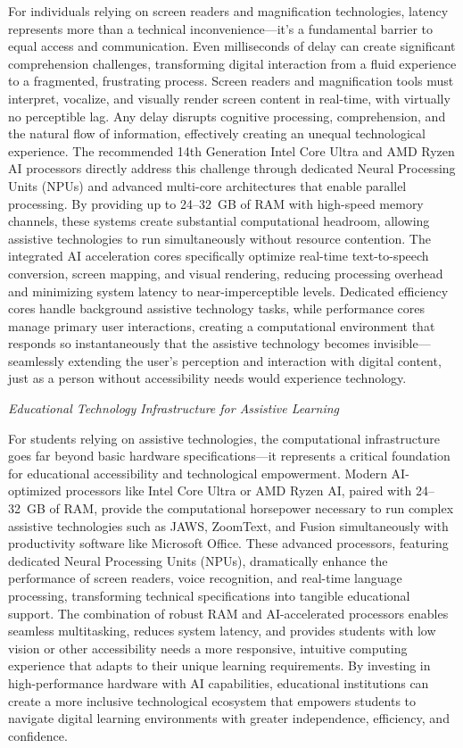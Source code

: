 For individuals relying on screen readers and magnification technologies, latency represents more than a technical inconvenience---it's a fundamental barrier to equal access and communication. Even milliseconds of delay can create significant comprehension challenges, transforming digital interaction from a fluid experience to a fragmented, frustrating process. Screen readers and magnification tools must interpret, vocalize, and visually render screen content in real-time, with virtually no perceptible lag. Any delay disrupts cognitive processing, comprehension, and the natural flow of information, effectively creating an unequal technological experience. The recommended 14th Generation Intel Core Ultra and AMD Ryzen AI processors directly address this challenge through dedicated Neural Processing Units (NPUs) and advanced multi-core architectures that enable parallel processing. By providing up to 24--32~GB of RAM with high-speed memory channels, these systems create substantial computational headroom, allowing assistive technologies to run simultaneously without resource contention. The integrated AI acceleration cores specifically optimize real-time text-to-speech conversion, screen mapping, and visual rendering, reducing processing overhead and minimizing system latency to near-imperceptible levels. Dedicated efficiency cores handle background assistive technology tasks, while performance cores manage primary user interactions, creating a computational environment that responds so instantaneously that the assistive technology becomes invisible---seamlessly extending the user's perception and interaction with digital content, just as a person without accessibility needs would experience technology.

\emph{Educational Technology Infrastructure for Assistive Learning}

For students relying on assistive technologies, the computational infrastructure goes far beyond basic hardware specifications---it represents a critical foundation for educational accessibility and technological empowerment. Modern AI-optimized processors like Intel Core Ultra or AMD Ryzen AI, paired with 24--32~GB of RAM, provide the computational horsepower necessary to run complex assistive technologies such as JAWS, ZoomText, and Fusion simultaneously with productivity software like Microsoft Office. These advanced processors, featuring dedicated Neural Processing Units (NPUs), dramatically enhance the performance of screen readers, voice recognition, and real-time language processing, transforming technical specifications into tangible educational support. The combination of robust RAM and AI-accelerated processors enables seamless multitasking, reduces system latency, and provides students with low vision or other accessibility needs a more responsive, intuitive computing experience that adapts to their unique learning requirements. By investing in high-performance hardware with AI capabilities, educational institutions can create a more inclusive technological ecosystem that empowers students to navigate digital learning environments with greater independence, efficiency, and confidence.

